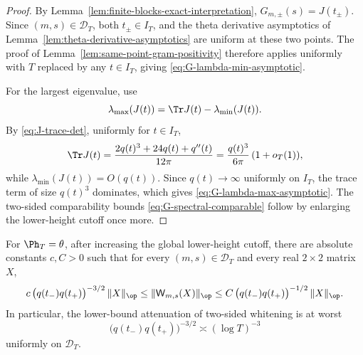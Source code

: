 \begin{proof}
By Lemma~\ref{lem:finite-blocks-exact-interpretation},
\(G_{m,\pm}(s)=J(t_\pm)\).  Since \((m,s)\in\mathcal D_T\), both
\(t_\pm\in I_T\), and the theta derivative asymptotics of
Lemma~\ref{lem:theta-derivative-asymptotics} are uniform at these two
points.  The proof of Lemma~\ref{lem:same-point-gram-positivity} therefore
applies uniformly with \(T\) replaced by any \(t\in I_T\), giving
\eqref{eq:G-lambda-min-asymptotic}.

For the largest eigenvalue, use
\[
        \lambda_{\max}(J(t))
        =\Tr J(t)-\lambda_{\min}(J(t)).
\]
By \eqref{eq:J-trace-det}, uniformly for \(t\in I_T\),
\[
        \Tr J(t)
        =\frac{2q(t)^3+24q(t)+q''(t)}{12\pi}
        =\frac{q(t)^3}{6\pi}\,(1+o_T(1)),
\]
while \(\lambda_{\min}(J(t))=O(q(t))\).  Since \(q(t)\to\infty\)
uniformly on \(I_T\), the trace term of size \(q(t)^3\) dominates,
which gives \eqref{eq:G-lambda-max-asymptotic}.  The two-sided
comparability bounds \eqref{eq:G-spectral-comparable} follow by enlarging
the lower-height cutoff once more.
\end{proof}

\begin{lemma}
\label{lem:two-sided-whitening-ledger}
For \(\Ph_T=\theta\), after increasing the global lower-height cutoff,
there are absolute constants \(c,C>0\) such that for every
\((m,s)\in\mathcal D_T\) and every real \(2\times2\) matrix \(X\),
\begin{equation}
\label{eq:two-sided-whitening-ledger}
        c\,\bigl(q(t_-)q(t_+)\bigr)^{-3/2}\,
        \|X\|_{\op}
        \le
        \|\mathsf W_{m,s}(X)\|_{\op}
        \le
        C\,\bigl(q(t_-)q(t_+)\bigr)^{-1/2}\,
        \|X\|_{\op}.
\end{equation}
In particular, the lower-bound attenuation of two-sided whitening is at
worst
\begin{equation}
\label{eq:two-sided-whitening-log-loss}
        \bigl(q(t_-)q(t_+)\bigr)^{-3/2}
        \asymp (\log T)^{-3}
\end{equation}
uniformly on \(\mathcal D_T\).
\end{lemma}

